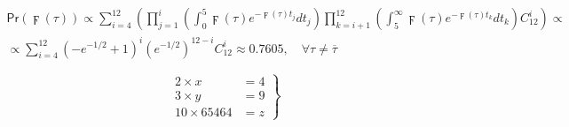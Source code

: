 %
%
%
%
%

\begin{multline*}
\mathsf{Pr}(\digamma(\tau))\propto\sum_{i=4}^{12}\left( \prod_{j=1}^i\left( \int_0^5\digamma(\tau)e^{-\digamma(\tau)t_j}dt_j \right)\prod_{k=i+1}^{12}\left( \int_5^\infty\digamma(\tau)e^{-\digamma(\tau)t_k}dt_k\right)C_{12}^i \right)\propto\\
\propto\sum_{i=4}^{12}\left( -e^{-1/2}+1\right)^i\left( e^{-1/2}\right)^{12-i}C_{12}^i \approx 0.7605,\quad \forall\tau\neq\overline{\tau}
\end{multline*}


\[\left.                                                          %
\begin{aligned}
2 \times x &= 4 \\
3 \times y &= 9 \\
10 \times 65464 &= z
\end{aligned}\right\} \]

